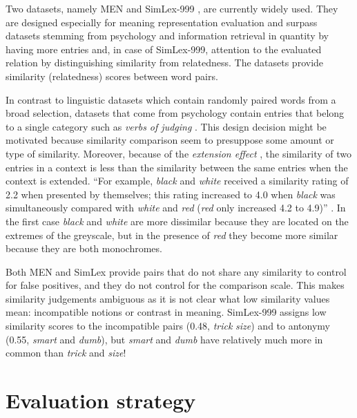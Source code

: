 \documentclass[11pt]{article}
\begin{document}
Two datasets, namely MEN \cite{Bruni:2012:DST:2390524.2390544} and SimLex-999 \cite{hill2014simlex}, are currently widely used. They are designed especially for meaning representation evaluation and surpass datasets stemming from psychology \cite{1986-13502-00119860101} and information retrieval \cite{2002:PSC:503104.503110} in quantity by having more entries and, in case of SimLex-999, attention to the evaluated relation by distinguishing similarity from relatedness. The datasets provide similarity (relatedness) scores between word pairs.

In contrast to linguistic datasets which contain randomly paired words from a broad selection, datasets that come from psychology contain entries that belong to a single category such as \textit{verbs of judging} \cite{FILLENBAUM197454}. This design decision might be motivated because similarity comparison seem to presuppose some amount or type of similarity. Moreover, because of the \emph{extension effect} \cite{medin1993respects}, the similarity of two entries in a context is less than the similarity between the same entries when the context is extended. ``For example, \textit{black} and \textit{white} received a similarity rating of 2.2 when presented by themselves; this rating increased to 4.0 when \textit{black} was simultaneously compared with \textit{white} and \textit{red} (\textit{red} only increased 4.2 to 4.9)'' \cite{medin1993respects}. In the first case \textit{black} and \textit{white} are more dissimilar because they are located on the extremes of the greyscale, but in the presence of \textit{red} they become more similar because they are both monochromes.

Both MEN and SimLex provide pairs that do not share any similarity to control for false positives, and they do not control for the comparison scale. This makes similarity judgements ambiguous as it is not clear what low similarity values mean: incompatible notions or contrast in meaning. SimLex-999 assigns low similarity scores to the incompatible pairs (0.48, \textit{trick} \textit{size}) and to antonymy (0.55, \textit{smart} and \textit{dumb}), but \textit{smart} and \textit{dumb} have relatively much more in common than \textit{trick} and \textit{size}!

\section{Evaluation strategy}

\end{document}
